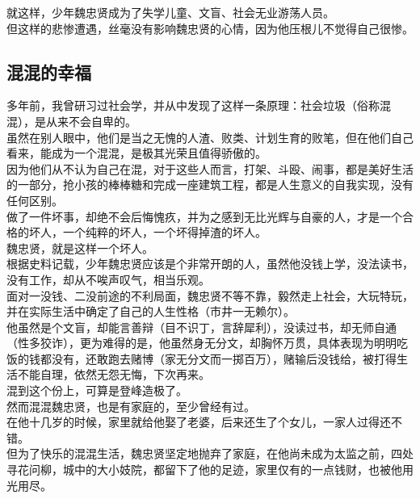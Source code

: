 \begin{multicols}{\theparacolNo}
就这样，少年魏忠贤成为了失学儿童、文盲、社会无业游荡人员。\\

但这样的悲惨遭遇，丝毫没有影响魏忠贤的心情，因为他压根儿不觉得自己很惨。\\

\subsection{混混的幸福}
多年前，我曾研习过社会学，并从中发现了这样一条原理：社会垃圾（俗称混混），是从来不会自卑的。\\

虽然在别人眼中，他们是当之无愧的人渣、败类、计划生育的败笔，但在他们自己看来，能成为一个混混，是极其光荣且值得骄傲的。\\

因为他们从不认为自己在混，对于这些人而言，打架、斗殴、闹事，都是美好生活的一部分，抢小孩的棒棒糖和完成一座建筑工程，都是人生意义的自我实现，没有任何区别。\\

做了一件坏事，却绝不会后悔愧疚，并为之感到无比光辉与自豪的人，才是一个合格的坏人，一个纯粹的坏人，一个坏得掉渣的坏人。\\

魏忠贤，就是这样一个坏人。\\

根据史料记载，少年魏忠贤应该是个非常开朗的人，虽然他没钱上学，没法读书，没有工作，却从不唉声叹气，相当乐观。\\

面对一没钱、二没前途的不利局面，魏忠贤不等不靠，毅然走上社会，大玩特玩，并在实际生活中确定了自己的人生性格（市井一无赖尔）。\\

他虽然是个文盲，却能言善辩（目不识丁，言辞犀利），没读过书，却无师自通（性多狡诈），更为难得的是，他虽然身无分文，却胸怀万贯，具体表现为明明吃饭的钱都没有，还敢跑去赌博（家无分文而一掷百万），赌输后没钱给，被打得生活不能自理，依然无怨无悔，下次再来。\\

混到这个份上，可算是登峰造极了。\\

然而混混魏忠贤，也是有家庭的，至少曾经有过。\\

在他十几岁的时候，家里就给他娶了老婆，后来还生了个女儿，一家人过得还不错。\\

但为了快乐的混混生活，魏忠贤坚定地抛弃了家庭，在他尚未成为太监之前，四处寻花问柳，城中的大小妓院，都留下了他的足迹，家里仅有的一点钱财，也被他用光用尽。\\


\end{multicols}
